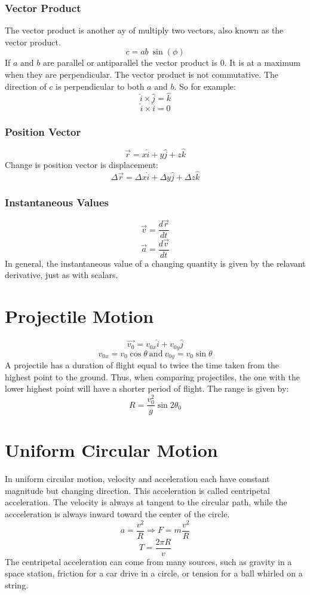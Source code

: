 \documentclass[12pt]{report}
\begin{document}
\begin{flushleft}
\subsubsection*{Vector Product}

The vector product is another ay of multiply two vectors, also known as the vector product.
\[c = ab\:\sin(\phi)\]
If \(a\) and \(b\) are parallel or antiparallel the vector product is \(0\). It is at a maximum
when they are perpendicular. The vector product is not commutative. The direction of \(c\)
is perpendicular to both \(a\) and \(b\). So for example:
\[\hat{i} \times \hat{j} = \hat{k}\]
\[\hat{i} \times \hat{i} = 0\]

\subsubsection*{Position Vector}
\[\vec{r} = x\hat{i} + y\hat{j} +z\hat{k}\]
Change is position vector is displacement:
\[\Delta\vec{r} = \Delta x \hat{i} + \Delta y \hat{j} + \Delta z \hat{k}\]

\subsubsection*{Instantaneous Values}
\[\vec{v} = \frac{d\vec{r}}{dt}\]
\[\vec{a} = \frac{d\vec{v}}{dt}\]
In general, the instantaneous value of a changing quantity is given by the relavant
derivative, just as with scalars.

\section*{Projectile Motion}
\[\vec{v_0} = v_{0x}\hat{i} + v_{0y}\hat{j}\]
\[v_{0x} = v_0\cos{\theta} \:\mathrm{and}\: v_{0y} = v_0\sin{\theta}\]
A projectile has a duration of flight equal to twice the time taken from the highest point to 
the ground. Thus, when comparing projectiles, the one with the lower highest point will
have a shorter period of flight. The range is given by:
\[R = \frac{v^2_0}{g}\sin 2 \theta_0\]

\section*{Uniform Circular Motion}
In uniform circular motion, velocity and acceleration each have constant magnitude but changing direction.
This acceleration is called centripetal acceleration. The velocity is always at tangent to the circular
path, while the accceleration is always inward toward the center of the circle.
\[a = \frac{v^2}{R} \Rightarrow F = m\frac{v^2}{R}\]
\[T = \frac{2\pi R }{v}\]
The centripetal acceleration can come from many sources, such as gravity in a space station, friction for 
a car drive in a circle, or tension for a ball whirled on a string.


\end{flushleft}
\end{document}

